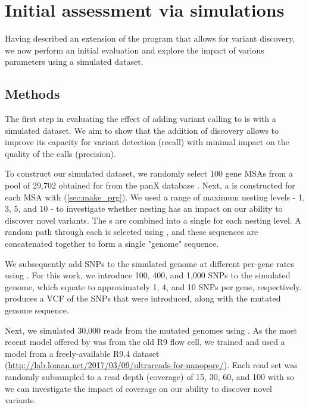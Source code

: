 \section{Initial assessment via simulations}
\label{sec:denovo-sims}
Having described an extension of the \pandora{} program that allows for \denovo{} variant discovery, we now perform an initial evaluation and explore the impact of various parameters using a simulated dataset.

\subsection{Methods}
\label{sec:denovo-sims-methods}

The first step in evaluating the effect of adding \denovo{} variant calling to \pandora{} is with a simulated dataset. We aim to show that the addition of \denovo{} discovery allows \pandora{} to improve its capacity for variant detection (recall) with minimal impact on the quality of the calls (precision). 

To construct our simulated dataset, we randomly select 100 gene MSAs from a pool of 29,702 obtained for \ecoli{} from the panX database \cite{panx}. Next, a \prg{} is constructed for each MSA with \makeprg{} (\autoref{sec:make_prg}). We used a range of \makeprg{} maximum nesting levels - 1, 3, 5, and 10 - to investigate whether \prg{} nesting has an impact on our ability to discover novel variants. The \prg{}s are combined into a single \panrg{} for each nesting level. A random path through each \prg{} is selected using \pandora{}, and these sequences are concatenated together to form a single "genome" sequence. 

We subsequently add SNPs to the simulated genome at different per-gene rates using  \cite{snpmutator}. For this work, we introduce 100, 400, and 1,000 SNPs to the simulated genome, which equate to approximately 1, 4, and 10 SNPs per gene, respectively.  produces a VCF of the SNPs that were introduced, along with the mutated genome sequence.

Next, we simulated 30,000 \ont{} reads from the mutated genomes using  \cite{yang2017,brinda2018}. As the most recent model offered by  was from the old R9 \ont{} flow cell, we trained and used a model from a freely-available \ecoli{} R9.4 dataset (\url{http://lab.loman.net/2017/03/09/ultrareads-for-nanopore/}). Each read set was randomly subsampled to a read depth (coverage) of 15, 30, 60, and 100 with  \cite{rasusa2019} so we can investigate the impact of coverage on our ability to discover novel variants.


